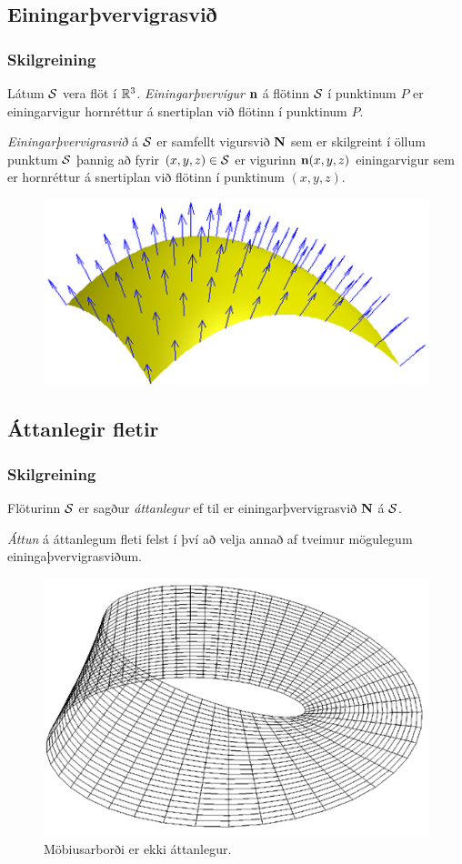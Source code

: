 \subsection{Einingarþvervigrasvið} 

\subsubsection{Skilgreining \rtask{}}

Látum $\cal S$ vera flöt í ${\mathbb R}^3$.  {\em Einingarþvervigur} $\mbox{${\bf n}$}$ á flötinn
$\cal S$ í punktinum $P$ er einingarvigur hornréttur á
snertiplan við flötinn í punktinum $P$.  

{\em Einingarþvervigrasvið} á
$\cal S$ er samfellt vigursvið $\mbox{${\bf N}$}$ sem er skilgreint í öllum punktum
$\cal S$ þannig að fyrir $(x,y,z)\in{\cal S}$ er vigurinn $\mbox{${\bf n}$}(x,y,z)$
einingarvigur sem er hornréttur á snertiplan við flötinn í punktinum
$(x,y,z)$.

\begin {figure}[h!]
 \centering
            \includegraphics[width=0.65\linewidth]{normalfield.png}
            \caption*{}
\end {figure}




\subsection{Áttanlegir fletir} 

\subsubsection{Skilgreining \rtask{}}

Flöturinn $\cal S$ er sagður {\em áttanlegur} ef til er einingarþvervigrasvið
$\mbox{${\bf N}$}$ á $\cal S$.  

\medskip
{\em Áttun} á áttanlegum fleti felst í því að velja annað af tveimur
mögulegum einingaþvervigrasviðum. 


\begin {figure}[h!]
 \centering
            \includegraphics[width=0.40\linewidth]{mobius.png}
            \caption*{Möbiusarborði er ekki áttanlegur.}
\end {figure}

